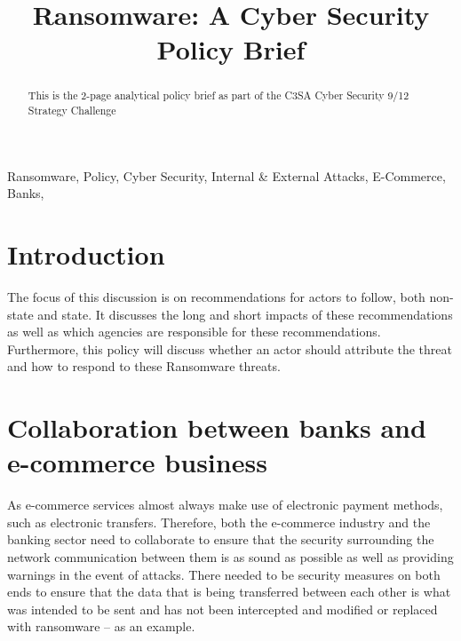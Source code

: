 \documentclass[conference]{IEEEtran}
\begin{document}
\title{Ransomware: A Cyber Security Policy Brief}

\author{
\and
{}
\and
{}
\and
{}
}

\maketitle

\begin{abstract}
This is the 2-page analytical policy brief as part of the C3SA Cyber Security 9/12 Strategy Challenge
\end{abstract}

\begin{IEEEkeywords}
Ransomware, Policy, Cyber Security, Internal \& External Attacks, E-Commerce, Banks, 
\end{IEEEkeywords}

\section{Introduction}
The focus of this discussion is on recommendations for actors to follow, both non-state and state. It discusses the long and short impacts of these recommendations as well as which agencies are responsible for these recommendations. Furthermore, this policy will discuss whether an actor should attribute the threat and how to respond to these Ransomware threats.
\section{Collaboration between banks and e-commerce business}
As e-commerce services almost always make use of electronic payment methods, such as electronic transfers. Therefore, both the e-commerce industry and the banking sector need to collaborate to ensure that the security surrounding the network communication between them is as sound as possible as well as providing warnings in the event of attacks. There needed to be security measures on both ends to ensure that the data that is being transferred between each other is what was intended to be sent and has not been intercepted and modified or replaced with ransomware – as an example.
\end{document}
